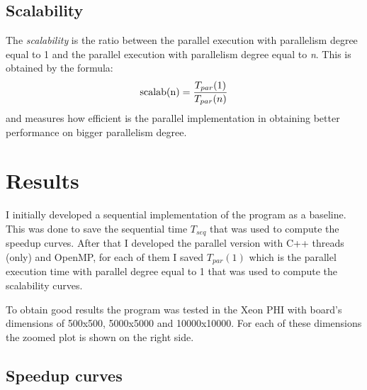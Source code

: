 \documentclass[a4paper,10pt]{article}
\begin{document}
\subsection{Scalability}
The \textit{scalability} is the ratio between the parallel execution with parallelism degree equal to 1 and the parallel execution with parallelism degree equal to \textit{n}. This is obtained by the formula:
\begin{equation}
\textnormal{scalab(n)} = \frac{T_{par}(1)}{T_{par}(n)}
\end{equation}
and measures how efficient is the parallel implementation in obtaining better performance on bigger parallelism degree.
\section{Results}
I initially developed a sequential implementation of the program as a baseline. This was done to save the sequential time $T_{seq}$ that was used to compute the speedup curves. After that I developed the parallel version with C++ threads (only) and OpenMP, for each of them I saved $T_{par}(1)$ which is the parallel execution time with parallel degree equal to 1 that was used to compute the scalability curves. 

To obtain good results the program was tested in the Xeon PHI with board's dimensions of 500x500, 5000x5000 and 10000x10000. For each of these dimensions the zoomed plot is shown on the right side. 



\subsection{Speedup curves}
\end{document}

